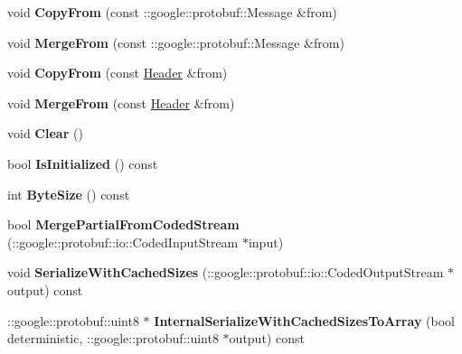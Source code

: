 \begin{DoxyCompactItemize}
void {\bfseries Copy\+From} (const \+::google\+::protobuf\+::\+Message \&from)
\item 
\hypertarget{classstruct_definitions_1_1_header_a752f1ed17a7f0eaa909f055122dc17f1}{}\label{classstruct_definitions_1_1_header_a752f1ed17a7f0eaa909f055122dc17f1} 
void {\bfseries Merge\+From} (const \+::google\+::protobuf\+::\+Message \&from)
\item 
\hypertarget{classstruct_definitions_1_1_header_a545157947d578f1ab538c9d56a2cc7e6}{}\label{classstruct_definitions_1_1_header_a545157947d578f1ab538c9d56a2cc7e6} 
void {\bfseries Copy\+From} (const \hyperlink{classstruct_definitions_1_1_header}{Header} \&from)
\item 
\hypertarget{classstruct_definitions_1_1_header_aaed8f3b5e1fcbe43be43535b561a36d9}{}\label{classstruct_definitions_1_1_header_aaed8f3b5e1fcbe43be43535b561a36d9} 
void {\bfseries Merge\+From} (const \hyperlink{classstruct_definitions_1_1_header}{Header} \&from)
\item 
\hypertarget{classstruct_definitions_1_1_header_adbe5d32414cbf804aa5154e26311d9e8}{}\label{classstruct_definitions_1_1_header_adbe5d32414cbf804aa5154e26311d9e8} 
void {\bfseries Clear} ()
\item 
\hypertarget{classstruct_definitions_1_1_header_a51d20c2813ab438b909d7af5624b9174}{}\label{classstruct_definitions_1_1_header_a51d20c2813ab438b909d7af5624b9174} 
bool {\bfseries Is\+Initialized} () const
\item 
\hypertarget{classstruct_definitions_1_1_header_a33bb57bb0ca9c712022087d2ef3cf4b9}{}\label{classstruct_definitions_1_1_header_a33bb57bb0ca9c712022087d2ef3cf4b9} 
int {\bfseries Byte\+Size} () const
\item 
\hypertarget{classstruct_definitions_1_1_header_a02cc8b4754a74eafc952be2db190cb3b}{}\label{classstruct_definitions_1_1_header_a02cc8b4754a74eafc952be2db190cb3b} 
bool {\bfseries Merge\+Partial\+From\+Coded\+Stream} (\+::google\+::protobuf\+::io\+::\+Coded\+Input\+Stream $\ast$input)
\item 
\hypertarget{classstruct_definitions_1_1_header_a603ead45167ba131331d64f2968b0fd3}{}\label{classstruct_definitions_1_1_header_a603ead45167ba131331d64f2968b0fd3} 
void {\bfseries Serialize\+With\+Cached\+Sizes} (\+::google\+::protobuf\+::io\+::\+Coded\+Output\+Stream $\ast$output) const
\item 
\hypertarget{classstruct_definitions_1_1_header_af969d5496ddb8b42ba50e2ad94b34953}{}\label{classstruct_definitions_1_1_header_af969d5496ddb8b42ba50e2ad94b34953} 
\+::google\+::protobuf\+::uint8 $\ast$ {\bfseries Internal\+Serialize\+With\+Cached\+Sizes\+To\+Array} (bool deterministic, \+::google\+::protobuf\+::uint8 $\ast$output) const

\end{DoxyCompactItemize}
